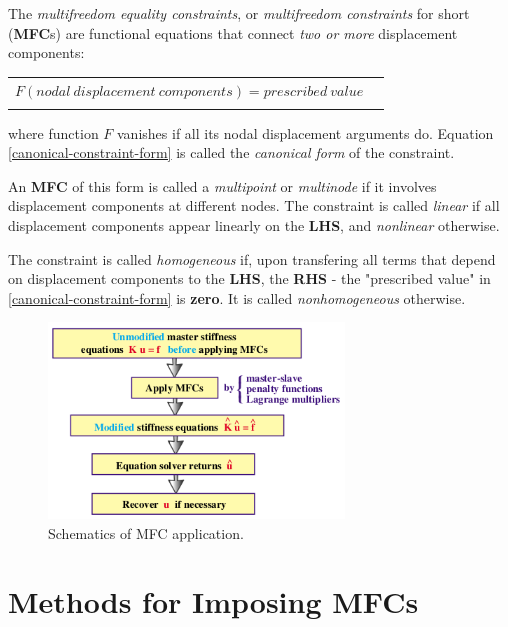 \documentclass[10pt,b5paper,titlepage]{book}
\newenvironment{bbox}[1][0.96]
{
    \begin{center}
        \begin{tabular}{|p{#1\textwidth}|}
            \hline\\
}
{
            \\\\\hline
        \end{tabular}
    \end{center}
}
\begin{document}
The \textit{multifreedom equality constraints}, or \textit{multifreedom constraints}
for short (\textbf{MFC}s) are functional equations that connect
\textit{two or more} displacement components:

\begin{bbox}
    \begin{equation}\label{canonical-constraint-form}
        F(nodal\ displacement\ components) = prescribed\ value \quad
    \end{equation}
\end{bbox}

where function $ F $ vanishes if all its nodal displacement arguments do.
Equation \eqref{canonical-constraint-form} is called the
\textit{canonical form} of the constraint.

An \textbf{MFC} of this form is called a \textit{multipoint} or \textit{multinode}
if it involves displacement components at different nodes. The constraint is
called \textit{linear} if all displacement components appear linearly on the
\textbf{LHS}, and \textit{nonlinear} otherwise.

The constraint is called \textit{homogeneous} if, upon transfering all terms
that depend on displacement components to the \textbf{LHS}, the \textbf{RHS} -
the "prescribed value" in \eqref{canonical-constraint-form} is \textbf{zero}.
It is called \textit{nonhomogeneous} otherwise.


\begin{figure}[ht]
    \centering
    \includegraphics[width=0.70\textwidth]{img/mfc_schematic.png}
    \caption{Schematics of MFC application.}
    \label{fig:MFC-schematic}
\end{figure}


\section{Methods for Imposing MFCs}
\end{document}
